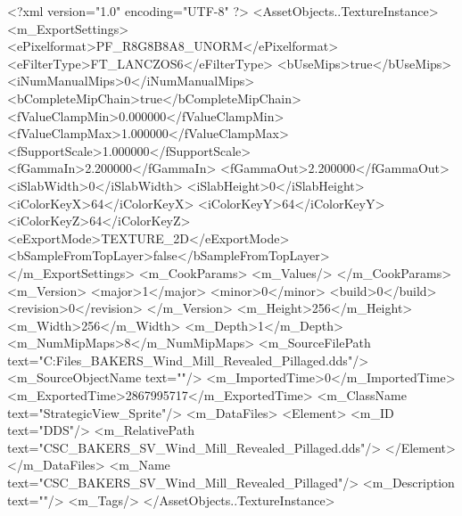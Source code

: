 <?xml version="1.0" encoding="UTF-8" ?>
<AssetObjects..TextureInstance>
	<m_ExportSettings>
		<ePixelformat>PF_R8G8B8A8_UNORM</ePixelformat>
		<eFilterType>FT_LANCZOS6</eFilterType>
		<bUseMips>true</bUseMips>
		<iNumManualMips>0</iNumManualMips>
		<bCompleteMipChain>true</bCompleteMipChain>
		<fValueClampMin>0.000000</fValueClampMin>
		<fValueClampMax>1.000000</fValueClampMax>
		<fSupportScale>1.000000</fSupportScale>
		<fGammaIn>2.200000</fGammaIn>
		<fGammaOut>2.200000</fGammaOut>
		<iSlabWidth>0</iSlabWidth>
		<iSlabHeight>0</iSlabHeight>
		<iColorKeyX>64</iColorKeyX>
		<iColorKeyY>64</iColorKeyY>
		<iColorKeyZ>64</iColorKeyZ>
		<eExportMode>TEXTURE_2D</eExportMode>
		<bSampleFromTopLayer>false</bSampleFromTopLayer>
	</m_ExportSettings>
	<m_CookParams>
		<m_Values/>
	</m_CookParams>
	<m_Version>
		<major>1</major>
		<minor>0</minor>
		<build>0</build>
		<revision>0</revision>
	</m_Version>
	<m_Height>256</m_Height>
	<m_Width>256</m_Width>
	<m_Depth>1</m_Depth>
	<m_NumMipMaps>8</m_NumMipMaps>
	<m_SourceFilePath text="C:\Users\Shadow\Desktop\Working Files\Icons\StrategicView\CSC_BAKERS_Wind_Mill_Revealed_Pillaged.dds"/>
	<m_SourceObjectName text=""/>
	<m_ImportedTime>0</m_ImportedTime>
	<m_ExportedTime>2867995717</m_ExportedTime>
	<m_ClassName text="StrategicView_Sprite"/>
	<m_DataFiles>
		<Element>
			<m_ID text="DDS"/>
			<m_RelativePath text="CSC_BAKERS_SV_Wind_Mill_Revealed_Pillaged.dds"/>
		</Element>
	</m_DataFiles>
	<m_Name text="CSC_BAKERS_SV_Wind_Mill_Revealed_Pillaged"/>
	<m_Description text=""/>
	<m_Tags/>
</AssetObjects..TextureInstance>

